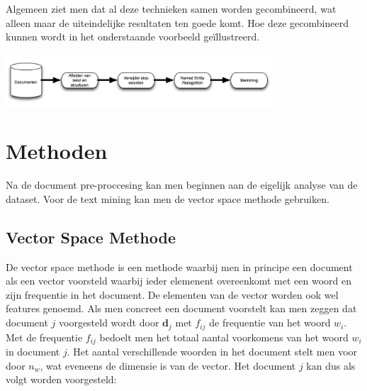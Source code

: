 \newline
Algemeen ziet men dat al deze technieken samen worden gecombineerd, wat alleen maar de uiteindelijke resultaten ten goede komt. Hoe deze gecombineerd kunnen wordt in het onderstaande voorbeeld ge\"illustreerd. 
\newline
\begin{center}
  \includegraphics[width=10cm]{document_preprocessing}
\end{center}

\section{Methoden}\label{Methoden}
Na de document pre-proccesing kan men beginnen aan de eigelijk analyse van de dataset. Voor de text mining kan men de vector space methode gebruiken.
\subsection{Vector Space Methode}\label{Vector Space Methode}
De vector space methode is een methode waarbij men in principe een document als een vector voorsteld waarbij ieder elemenent overeenkomt met een woord en zijn frequentie in het document. De elementen van de vector worden ook wel features genoemd. Als men concreet een document voorstelt kan men zeggen dat document $j$ voorgesteld wordt door $\textbf{d}_{j}$ met $f_{ij}$ de frequentie van het woord $w_{i}$. Met de frequentie $f_{ij}$ bedoelt men het totaal aantal voorkomens van het woord $w_{i}$ in document $j$. Het aantal verschillende woorden in het document stelt men voor door $n_{w}$, wat eveneens de dimensie is van de vector.
Het document $j$ kan dus als volgt worden voorgesteld:

